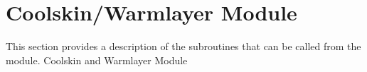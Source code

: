 \documentclass[letterpaper,10pt,english]{sphinxmanual}
\begin{document}
\section{Cool\sphinxhyphen{}skin/Warm\sphinxhyphen{}layer Module}
\label{\detokenize{users_guide:cool-skin-warm-layer-module}}
\sphinxAtStartPar
This section provides a description of the sub\sphinxhyphen{}routines that can be called from the  module.
\label{\detokenize{users_guide:module-AirSeaFluxCode.cs_wl_subs}}
\sphinxAtStartPar
Cool\sphinxhyphen{}skin and Warmlayer Module
\end{document}
